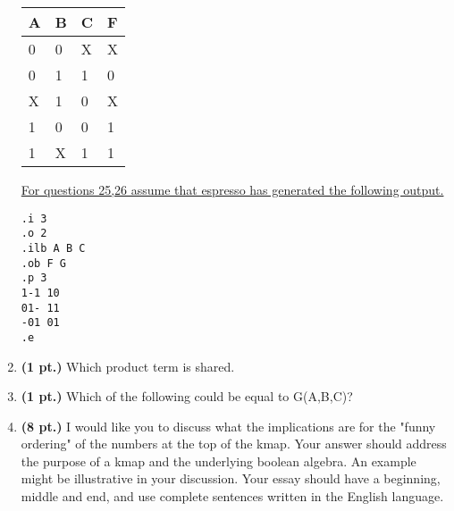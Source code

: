 \documentclass{article}
\begin{document}
\begin{enumerate}
\begin{tabular}{l|l|l||l}
A & B & C & F \\ \hline \hline
0 & 0 & X & X \\ \hline
0 & 1 & 1 & 0 \\ \hline
X & 1 & 0 & X \\ \hline
1 & 0 & 0 & 1 \\ \hline
1 & X & 1 & 1 \\
\end{tabular}


\underline{For questions 25,26 assume that espresso has generated the following output.}
\begin{verbatim}
.i 3
.o 2
.ilb A B C
.ob F G
.p 3
1-1 10
01- 11
-01 01
.e
\end{verbatim}

\item{\bf (1 pt.)}  Which product term is shared.

\item{\bf (1 pt.)}  Which of the following could be equal to G(A,B,C)?

\pagebreak
\item{\bf (8 pt.)} I would like you to discuss what the implications
are for the "funny ordering" of the numbers at the top of the kmap.
Your answer should address the purpose of a kmap and the underlying
boolean algebra.  An example might be illustrative in your discussion.
Your essay should have a beginning, middle and end, and use complete
sentences written in the English language. \\


\end{enumerate}
\end{document}
